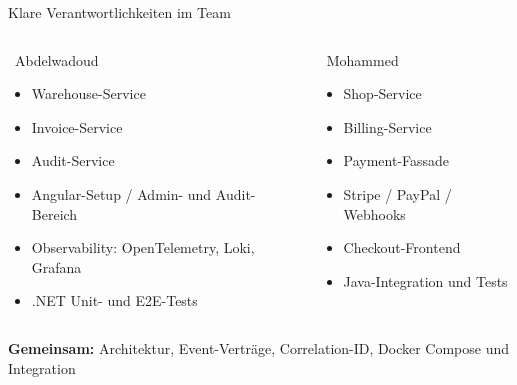 \documentclass[aspectratio=169,11pt]{beamer}
\newcommand{\speakerA}{\textcolor{DotnetBlue}{\faUser\ Abdelwadoud}}
\newcommand{\speakerB}{\textcolor{JavaOrange}{\faUser\ Mohammed}}
\begin{document}
\begin{frame}{Klare Verantwortlichkeiten im Team}
\small
\begin{columns}[T,onlytextwidth]
\begin{block}{\speakerA}
\begin{itemize}
  \item Warehouse-Service
  \item Invoice-Service
  \item Audit-Service
  \item Angular-Setup / Admin- und Audit-Bereich
  \item Observability: OpenTelemetry, Loki, Grafana
  \item .NET Unit- und E2E-Tests
\end{itemize}
\end{block}
\begin{block}{\speakerB}
\begin{itemize}
  \item Shop-Service
  \item Billing-Service
  \item Payment-Fassade
  \item Stripe / PayPal / Webhooks
  \item Checkout-Frontend
  \item Java-Integration und Tests
\end{itemize}
\end{block}
\end{columns}
\vspace{.2cm}
\centering\textbf{Gemeinsam:} Architektur, Event-Verträge, Correlation-ID, Docker Compose und Integration
\end{frame}
\end{document}
